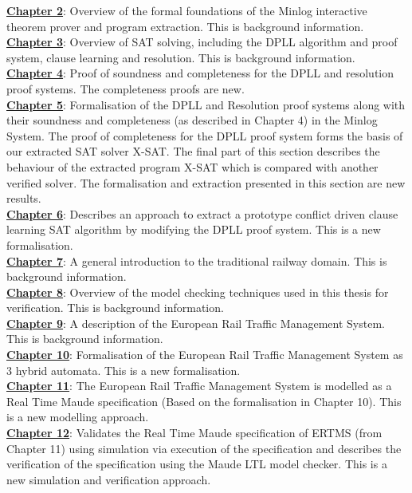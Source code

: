 \textbf{\ul{Chapter 2}}: Overview of the formal foundations of the Minlog interactive theorem prover and program extraction. This is background information.
\medskip \\
\textbf{\ul{Chapter 3}}: Overview of SAT solving, including the DPLL algorithm and  proof system, clause learning and resolution. This is background information.
\medskip \\
\textbf{\ul{Chapter 4}}: Proof of soundness and completeness for the DPLL and resolution proof systems. The completeness proofs are new.
\medskip  \\
\textbf{\ul{Chapter 5}}: Formalisation of the DPLL and Resolution proof systems along with their soundness and completeness (as described in Chapter 4) in the Minlog System. The proof of completeness for the DPLL proof system forms the basis of our extracted SAT solver X-SAT. The final part of this section describes the behaviour of the extracted program X-SAT which is compared with another verified solver. The formalisation and extraction presented in this section are new results.
\medskip \\ 
\textbf{\ul{Chapter 6}}: Describes an approach to extract a prototype conflict driven clause learning SAT algorithm by modifying the DPLL proof system. This is a new formalisation.
\medskip \\
\textbf{\ul{Chapter 7}}: A general introduction to the traditional railway domain. This is background information.
\medskip \\
\textbf{\ul{Chapter 8}}: Overview of the model checking techniques used in this thesis for verification. This is background information. \medskip \\
\textbf{\ul{Chapter 9}}: A description of the European Rail Traffic Management System. This is background information.
\medskip \\
\textbf{\ul{Chapter 10}}: Formalisation of the European Rail Traffic Management System as 3 hybrid automata. This is a new formalisation.
\medskip \\
\textbf{\ul{Chapter 11}}: The European Rail Traffic Management System is modelled as a Real Time Maude  specification (Based on the formalisation in Chapter 10). This is a new modelling approach.
\medskip \\
\textbf{\ul{Chapter 12}}: Validates the Real Time Maude specification of ERTMS (from Chapter 11) using simulation via execution of the specification and describes the verification of the specification using the Maude LTL model checker. This is a new simulation and verification approach.


